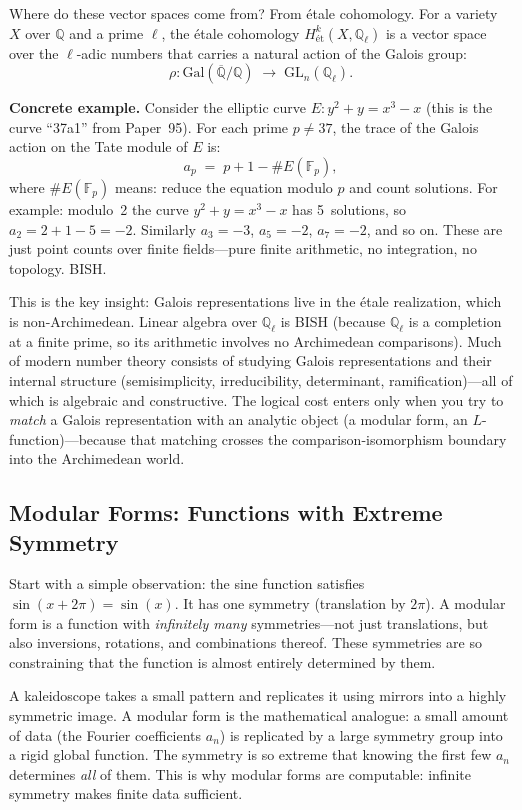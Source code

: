 \documentclass[11pt,twoside,openany]{report}
\theoremstyle{remark}
\newcommand{\BISH}{\textsf{BISH}}
\begin{document}
Where do these vector spaces come from? From \'etale cohomology. For a variety $X$ over $\mathbb{Q}$ and a prime $\ell$, the \'etale cohomology $H^k_{\text{\'et}}(X, \mathbb{Q}_\ell)$ is a vector space over the $\ell$-adic numbers that carries a natural action of the Galois group:
\[
  \rho\colon \mathrm{Gal}(\overline{\mathbb{Q}}/\mathbb{Q}) \;\longrightarrow\; \mathrm{GL}_n(\mathbb{Q}_\ell).
\]

\textbf{Concrete example.} Consider the elliptic curve $E\colon y^2 + y = x^3 - x$ (this is the curve ``37a1'' from Paper~95). For each prime $p \neq 37$, the trace of the Galois action on the Tate module of $E$ is:
\[
  a_p \;=\; p + 1 - \#E(\mathbb{F}_p),
\]
where $\#E(\mathbb{F}_p)$ means: reduce the equation modulo $p$ and count solutions. For example: modulo~2 the curve $y^2 + y = x^3 - x$ has 5~solutions, so $a_2 = 2 + 1 - 5 = -2$. Similarly $a_3 = -3$, $a_5 = -2$, $a_7 = -2$, and so on. These are just point counts over finite fields---pure finite arithmetic, no integration, no topology. \BISH.

This is the key insight: Galois representations live in the \'etale realization, which is non-Archimedean. Linear algebra over $\mathbb{Q}_\ell$ is \BISH{} (because $\mathbb{Q}_\ell$ is a completion at a finite prime, so its arithmetic involves no Archimedean comparisons). Much of modern number theory consists of studying Galois representations and their internal structure (semisimplicity, irreducibility, determinant, ramification)---all of which is algebraic and constructive. The logical cost enters only when you try to \emph{match} a Galois representation with an analytic object (a modular form, an $L$-function)---because that matching crosses the comparison-isomorphism boundary into the Archimedean world.

\subsection*{Modular Forms: Functions with Extreme Symmetry}

Start with a simple observation: the sine function satisfies $\sin(x + 2\pi) = \sin(x)$. It has one symmetry (translation by $2\pi$). A modular form is a function with \emph{infinitely many} symmetries---not just translations, but also inversions, rotations, and combinations thereof. These symmetries are so constraining that the function is almost entirely determined by them.

\begin{analogybox}
A kaleidoscope takes a small pattern and replicates it using mirrors into a highly symmetric image. A modular form is the mathematical analogue: a small amount of data (the Fourier coefficients $a_n$) is replicated by a large symmetry group into a rigid global function. The symmetry is so extreme that knowing the first few $a_n$ determines \emph{all} of them. This is why modular forms are computable: infinite symmetry makes finite data sufficient.
\end{analogybox}
\end{document}
